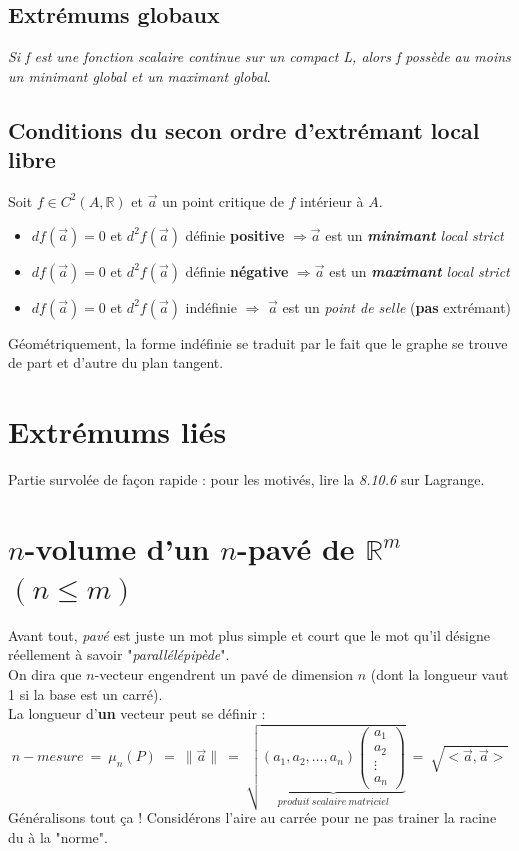 \documentclass	[11pt, a4paper, openany]{book}
\begin{document}
\subsection{Extrémums globaux}
\textit{Si f est une fonction scalaire continue sur un compact L, alors f possède au moins un minimant global et un maximant global}.

\subsection{Conditions du secon ordre d'extrémant local libre}
Soit $f \in C^2 (A, \mathbb{R})$ et $\vec{a}$ un point critique de $f$ intérieur à $A$.
\begin{itemize}
\item $df(\vec{a}) = 0$ et $d^2f(\vec{a})$ définie \textbf{positive} $\Rightarrow \vec{a}$ est un \textit{\textbf{minimant} local strict}
\item $df(\vec{a}) = 0$ et $d^2f(\vec{a})$ définie \textbf{négative} $\Rightarrow \vec{a}$ est un \textit{\textbf{maximant} local strict}
\item $df(\vec{a}) = 0$ et $d^2f(\vec{a})$ indéfinie $\Rightarrow$ $\vec{a}$ est un \textit{point de selle} (\textbf{pas} extrémant)
\end{itemize}
Géométriquement, la forme indéfinie se traduit par le fait que le graphe se trouve de part et d'autre du plan tangent.

\section{Extrémums liés}
Partie survolée de façon rapide : pour les motivés, lire la \textit{8.10.6} sur Lagrange.

\section{$n$-volume d'un $n$-pavé de $\mathbb{R}^m$ $(n \leq m)$}
Avant tout, \textit{pavé} est juste un mot plus simple et court que le mot qu'il désigne réellement à savoir "\textit{parallélépipède}".\\
On dira que $n$-vecteur engendrent un pavé de dimension $n$ (dont la longueur vaut 1 si la base est un carré).\\

La longueur d'\textbf{un} vecteur peut se définir : 
$$n-mesure\ =\ \mu_n(P)\ =\ \parallel\vec{a}\parallel\ =\ \sqrt{\underbrace{\left(a_1, a_2, ..., a_n\right)\begin{pmatrix}
a_1\\
a_2\\
\vdots\\
a_n
\end{pmatrix}}_{produit\ scalaire\ matriciel}}\ =\ \sqrt{<\vec{a}, \vec{a}>} $$
Généralisons tout ça ! Considérons l'aire au carrée pour ne pas trainer la racine du à la "norme".
\end{document}
